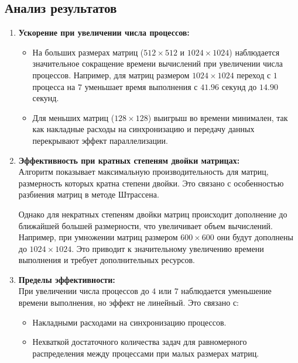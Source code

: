 \documentclass[a4paper, 14pt]{extarticle}
\begin{document}
\subsection{Анализ результатов}
\begin{enumerate}
\item \textbf{Ускорение при увеличении числа процессов:} 
   \begin{itemize}
       \item На больших размерах матриц (\(512 \times 512\) и \(1024 \times 1024\)) наблюдается значительное сокращение времени вычислений при увеличении числа процессов. Например, для матриц размером \(1024 \times 1024\) переход с \(1\) процесса на \(7\) уменьшает время выполнения с \(41.96\) секунд до \(14.90\) секунд.
       \item Для меньших матриц (\(128 \times 128\)) выигрыш во времени минимален, так как накладные расходы на синхронизацию и передачу данных перекрывают эффект параллелизации.
   \end{itemize}

\item\textbf{Эффективность при кратных степеням двойки матрицах:}  \\
   Алгоритм показывает максимальную производительность для матриц, размерность которых кратна степени двойки. Это связано с особенностью разбиения матриц в методе Штрассена.  

   Однако для некратных степеням двойки матриц происходит дополнение до ближайшей большей размерности, что увеличивает объем вычислений. Например, при умножении матриц размером \(600 \times 600\) они будут дополнены до \(1024 \times 1024\). Это приводит к значительному увеличению времени выполнения и требует дополнительных ресурсов.

\item \textbf{Пределы эффективности:}\\
   При увеличении числа процессов до \(4\) или \(7\) наблюдается уменьшение времени выполнения, но эффект не линейный. Это связано с:
   \begin{itemize}
       \item Накладными расходами на синхронизацию процессов.
       \item Нехваткой достаточного количества задач для равномерного распределения между процессами при малых размерах матриц.
   \end{itemize}
\end{enumerate}


    \newpage
\end{document}
